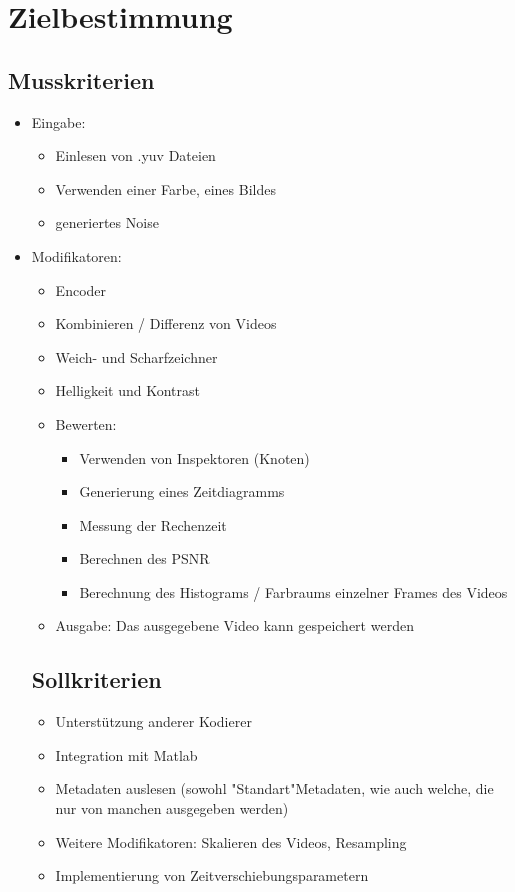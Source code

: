 \section{Zielbestimmung}

\subsection{Musskriterien}

\begin{itemize}
	\item Eingabe: 
	\begin{itemize}
		\item Einlesen von .yuv Dateien
		\item Verwenden einer Farbe, eines Bildes
		\item generiertes Noise
	\end{itemize}
	\item Modifikatoren:
	\begin{itemize}
		\item Encoder
		\item Kombinieren / Differenz von Videos
		\item Weich- und Scharfzeichner
		\item Helligkeit und Kontrast
	\item Bewerten:
	\begin{itemize}
		\item Verwenden von Inspektoren (Knoten)
		\item Generierung eines Zeitdiagramms
		\item Messung der Rechenzeit
		\item Berechnen des PSNR
		\item Berechnung des Histograms / Farbraums einzelner Frames des Videos
	\end{itemize}
	\item Ausgabe: Das ausgegebene Video kann gespeichert werden
\end{itemize}

\subsection{Sollkriterien}

\begin{itemize}
	\item Unterstützung anderer Kodierer
	\item Integration mit Matlab
	\item Metadaten auslesen (sowohl "Standart"Metadaten, wie auch welche, die nur von manchen ausgegeben werden)
	\item Weitere Modifikatoren: Skalieren des Videos, Resampling
	\item Implementierung von Zeitverschiebungsparametern
\end{itemize}


\end{itemize}
